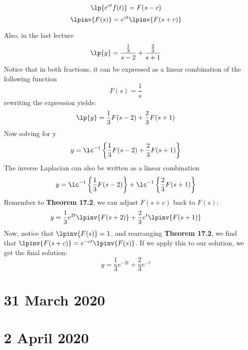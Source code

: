 \documentclass[twoside]{report}
\begin{document}
    \begin{btheorem}
        \begin{equation}
            \lp{e^{ct}f(t)} = F(s - c)
        \end{equation}
        \begin{equation}
            \lpinv{F(s)} = e^{ct}\lpinv{F(s + c)}
        \end{equation}
    \end{btheorem}\np
    Also, in the last lecture
    \begin{equation}
        \lp{y} = \frac{\frac{1}{3}}{s - 2} + \frac{\frac{2}{3}}{s + 1}
    \end{equation}
    Notice that in both fractions, it can be expressed as a linear combination of the following function
    \begin{equation}
        F(s) = \frac{1}{s}
    \end{equation}
    rewriting the expression yields:
    \begin{equation}
        \lp{y} = \frac{1}{3}F(s - 2) + \frac{2}{3}F(s + 1)
    \end{equation}
    Now solving for y
    \begin{equation}
        y = \lc^{-1}\left\{\frac{1}{3}F(s - 2) + \frac{2}{3}F(s + 1)\right\}
    \end{equation}
    The inverse Laplacian can also be written as a linear combination
    \begin{equation}
        y = \lc^{-1}\left\{\frac{1}{3}F(s - 2)\right\} + \lc^{-1}\left\{\frac{2}{3}F(s + 1)\right\}
    \end{equation}
    Remember to \textbf{Theorem 17.2}, we can adjust $F(s + c)$ back to $F(s)$:
    \begin{equation}
        y = \frac{1}{3}e^{2t}\lpinv{F(s + 2)} + \frac{2}{3}e^{t}\lpinv{F(s + 1)}
    \end{equation}
    Now, notice that $\lpinv{F(s)} = 1$, and rearranging \textbf{Theorem 17.2}, we find that $\lpinv{F(s + c)} = e^{-ct}\lpinv{F(s)}$. If we apply this to our solution, we get the final solution:
    \begin{equation}
        y = \frac{1}{3}e^{-2t}+\frac{2}{3}e^{-t}
    \end{equation}
    \chapter{31 March 2020}
    \chapter{2 April 2020}
\end{document}
